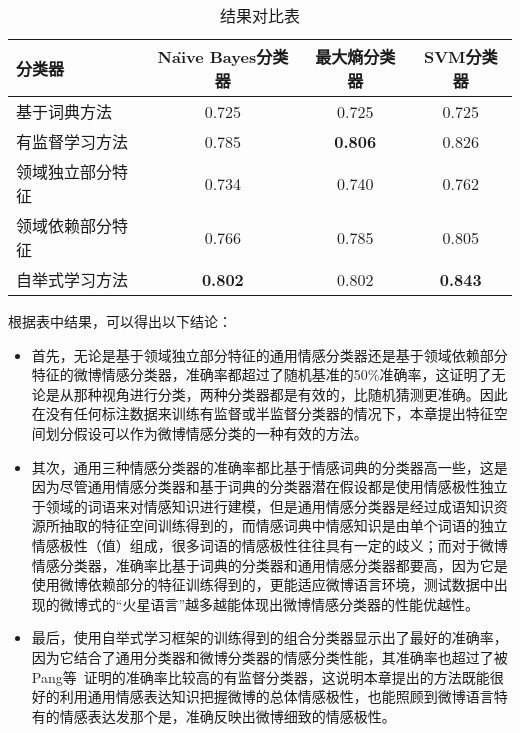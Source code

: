 \begin{table}[htp]
\caption{结果对比表}
\label{tab4-1}
\centering
\begin{tabular}{|l|c|c|c|}
\hline
分类器 &  Na\"\i ve Bayes分类器    &   最大熵分类器    &   SVM分类器    \\
\hline

基于词典方法 & 0.725 & 0.725 & 0.725 \\
\hline
有监督学习方法 & 0.785 & \textbf{0.806} & 0.826 \\
\hline
领域独立部分特征 & 0.734 &  0.740 & 0.762 \\
\hline
领域依赖部分特征 & 0.766 & 0.785 & 0.805 \\
\hline
自举式学习方法 & \textbf{0.802} & 0.802 & \textbf{0.843} \\
\hline
\end{tabular}
\end{table}

根据表中结果，可以得出以下结论：
\begin{itemize}
\item 首先，无论是基于领域独立部分特征的通用情感分类器还是基于领域依赖部分特征的微博情感分类器，准确率都超过了随机基准的50\%准确率，这证明了无论是从那种视角进行分类，两种分类器都是有效的，比随机猜测更准确。因此在没有任何标注数据来训练有监督或半监督分类器的情况下，本章提出特征空间划分假设可以作为微博情感分类的一种有效的方法。
\item 其次，通用三种情感分类器的准确率都比基于情感词典的分类器高一些，这是因为尽管通用情感分类器和基于词典的分类器潜在假设都是使用情感极性独立于领域的词语来对情感知识进行建模，但是通用情感分类器是经过成语知识资源所抽取的特征空间训练得到的，而情感词典中情感知识是由单个词语的独立情感极性（值）组成，很多词语的情感极性往往具有一定的歧义；而对于微博情感分类器，准确率比基于词典的分类器和通用情感分类器都要高，因为它是使用微博依赖部分的特征训练得到的，更能适应微博语言环境，测试数据中出现的微博式的“火星语言”越多越能体现出微博情感分类器的性能优越性。
\item 最后，使用自举式学习框架的训练得到的组合分类器显示出了最好的准确率，因为它结合了通用分类器和微博分类器的情感分类性能，其准确率也超过了被Pang等~证明的准确率比较高的有监督分类器，这说明本章提出的方法既能很好的利用通用情感表达知识把握微博的总体情感极性，也能照顾到微博语言特有的情感表达发那个是，准确反映出微博细致的情感极性。
\end{itemize}

